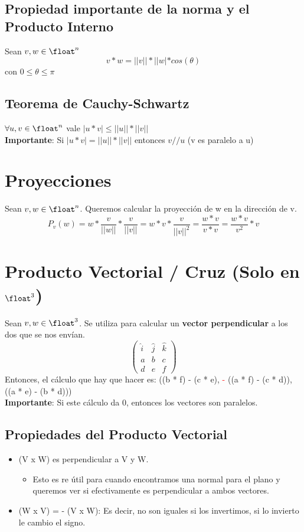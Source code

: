 \documentclass[10pt,a4paper]{article}
\begin{document}
\subsection*{Propiedad importante de la norma y el Producto Interno}
Sean $v, w \in \float^{n}$
\[ v * w = ||v|| * ||w| * cos(\theta)\] con $ 0 \le \theta \le \pi $
\subsection*{Teorema de Cauchy-Schwartz}
$\forall u, v \in \float^{n}$ vale $ |u * v| \le ||u|| * ||v||$ \\
\textbf{Importante}: Si $|u * v| = ||u|| * ||v||$ entonces $ v // u$ (v es paralelo a u)
\section*{Proyecciones}
Sean $v, w \in \float^{n}$. Queremos calcular la proyección de w en la dirección de v. 
\[P_{v}(w) = w * \frac{v}{||w||} * \frac{v}{||v||} = w * v * \frac{v}{||v||^{2}} = \frac{w * v}{v * v} = \frac{w * v}{v^{2}} * v\]
\section*{Producto Vectorial / Cruz (Solo en $\float^{3}$)}
Sean $v, w \in \float^{3}$. Se utiliza para calcular un \textbf{vector perpendicular} a los dos que se nos envían.
\[
\begin{pmatrix}
\hat{i} & \hat{j} & \hat{k} \\
a & b & c\\
d & e & f
\end{pmatrix}
\]
Entonces, el cálculo que hay que hacer es: ((b * f) - (c * e), \textcolor{red}{-} ((a * f) - (c * d)), ((a * e) - (b * d))) \\
\textbf{Importante}: Si este cálculo da 0, entonces los vectores son paralelos.
\subsection*{Propiedades del Producto Vectorial}
\begin{itemize}
    \item (V x W) es perpendicular a V y W.
    \begin{itemize}
        \item Esto es re útil para cuando encontramos una normal para el plano y queremos ver si efectivamente es perpendicular a ambos vectores.
    \end{itemize}
    \item (W x V) = - (V x W): Es decir, no son iguales si los invertimos, si lo invierto le cambio el signo. 
\end{itemize}
\end{document}
